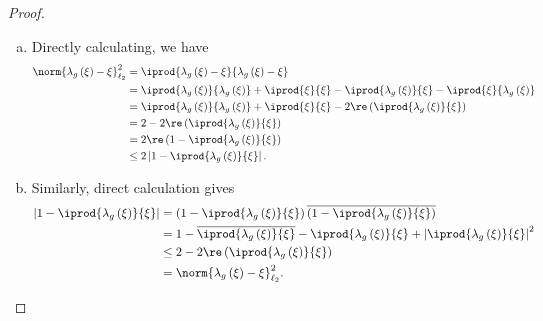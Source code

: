 \begin{proof}\hfill
  \begin{enumerate}[(a)]
    \item Directly calculating, we have
      \begin{align*}
        \norm{\lambda_g\left( \xi \right) - \xi}_{\ell_2}^2 &= \iprod{\lambda_g\left( \xi \right) - \xi}{ \lambda_g\left( \xi \right) - \xi }\\
                                                            &= \iprod{\lambda_g\left( \xi \right)}{\lambda_g\left( \xi \right)} + \iprod{\xi}{\xi} - \iprod{\lambda_g\left( \xi \right)}{\xi} - \iprod{\xi}{\lambda_g\left( \xi \right)}\\
                                                            &= \iprod{\lambda_g\left( \xi \right)}{\lambda_g\left( \xi \right)} + \iprod{\xi}{\xi} - 2\re\left( \iprod{\lambda_g\left( \xi \right)}{\xi} \right)\\
                                                            &= 2 - 2\re\left( \iprod{\lambda_g\left( \xi \right)}{\xi} \right)\\
                                                            &= 2\re\left( 1- \iprod{\lambda_g\left( \xi \right)}{\xi} \right)\\
                                                            &\leq 2 \left\vert 1- \iprod{\lambda_g\left( \xi \right)}{\xi} \right\vert.
      \end{align*}
    \item Similarly, direct calculation gives
      \begin{align*}
        \left\vert 1- \iprod{\lambda_g\left( \xi \right)}{\xi} \right\vert &= \left( 1- \iprod{\lambda_g\left( \xi \right)}{\xi} \right) \overline{\left( 1 - \iprod{\lambda_g\left( \xi \right)}{\xi} \right)}\\
                                                                           &= 1 - \overline{ \iprod{\lambda_g\left( \xi \right)}{\xi} } - \iprod{\lambda_g\left( \xi \right)}{\xi} + \left\vert \iprod{\lambda_g\left( \xi \right)}{\xi} \right\vert^2\\
                                                                           &\leq 2 - 2\re\left( \iprod{\lambda_g\left( \xi \right)}{\xi} \right)\\
                                                                           &= \norm{\lambda_g\left( \xi \right) - \xi}_{\ell_2}^2.
      \end{align*}
  \end{enumerate}
\end{proof}
